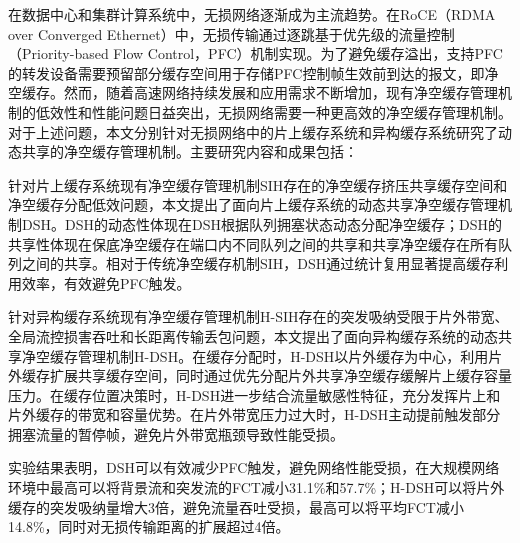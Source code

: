 
\begin{chineseabstract}
    在数据中心和集群计算系统中，无损网络逐渐成为主流趋势。在RoCE（RDMA over Converged Ethernet）中，无损传输通过逐跳基于优先级的流量控制（Priority-based Flow Control，PFC）机制实现。为了避免缓存溢出，支持PFC的转发设备需要预留部分缓存空间用于存储PFC控制帧生效前到达的报文，即净空缓存。然而，随着高速网络持续发展和应用需求不断增加，现有净空缓存管理机制的低效性和性能问题日益突出，无损网络需要一种更高效的净空缓存管理机制。对于上述问题，本文分别针对无损网络中的片上缓存系统和异构缓存系统研究了动态共享的净空缓存管理机制。主要研究内容和成果包括：

    针对片上缓存系统现有净空缓存管理机制SIH存在的净空缓存挤压共享缓存空间和净空缓存分配低效问题，本文提出了面向片上缓存系统的动态共享净空缓存管理机制DSH。DSH的动态性体现在DSH根据队列拥塞状态动态分配净空缓存；DSH的共享性体现在保底净空缓存在端口内不同队列之间的共享和共享净空缓存在所有队列之间的共享。相对于传统净空缓存机制SIH，DSH通过统计复用显著提高缓存利用效率，有效避免PFC触发。
    
    针对异构缓存系统现有净空缓存管理机制H-SIH存在的突发吸纳受限于片外带宽、全局流控损害吞吐和长距离传输丢包问题，本文提出了面向异构缓存系统的动态共享净空缓存管理机制H-DSH。在缓存分配时，H-DSH以片外缓存为中心，利用片外缓存扩展共享缓存空间，同时通过优先分配片外共享净空缓存缓解片上缓存容量压力。在缓存位置决策时，H-DSH进一步结合流量敏感性特征，充分发挥片上和片外缓存的带宽和容量优势。在片外带宽压力过大时，H-DSH主动提前触发部分拥塞流量的暂停帧，避免片外带宽瓶颈导致性能受损。
    
    实验结果表明，DSH可以有效减少PFC触发，避免网络性能受损，在大规模网络环境中最高可以将背景流和突发流的FCT减小31.1\%和57.7\%；H-DSH可以将片外缓存的突发吸纳量增大3倍，避免流量吞吐受损，最高可以将平均FCT减小14.8\%，同时对无损传输距离的扩展超过4倍。
    

\end{chineseabstract}

